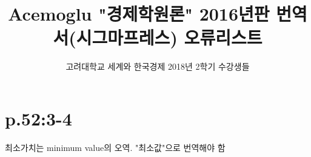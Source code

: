 \documentclass[a4paper]{article}
\author{고려대학교 세계와 한국경제 2018년 2학기 수강생들}
\title{Acemoglu "경제학원론" 2016년판 번역서(시그마프레스) 오류리스트}
\begin{document}
\maketitle
	
\section{p.52:3-4} %
\label{sec:p_52_3_4}
최소가치는 minimum value의 오역. "최소값"으로 번역해야 함
\end{document}
